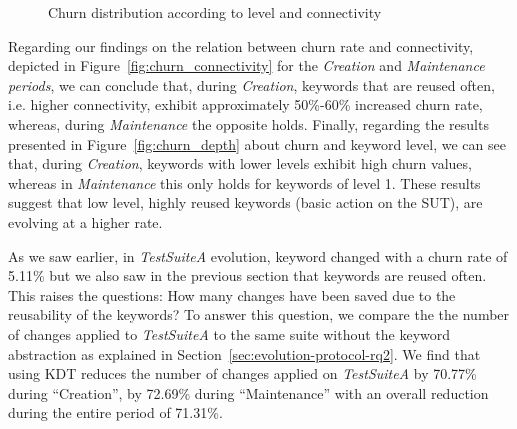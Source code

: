 \begin{figure}
\centering
{}
\caption{Churn distribution according to level and connectivity}  
\label{fig:churn:analysis}
\end{figure}

Regarding our findings on the relation between churn rate and connectivity, depicted in Figure~\ref{fig:churn_connectivity} for the \emph{Creation} and \emph{Maintenance periods}, we can conclude that, during \emph{Creation}, keywords that are reused often, i.e. higher connectivity, exhibit approximately 50\%-60\% increased churn rate, whereas, during \emph{Maintenance} the opposite holds. Finally, regarding the results presented in Figure~\ref{fig:churn_depth} about churn and keyword level, we can see that, during \emph{Creation}, keywords with lower levels exhibit high churn values, whereas in \emph{Maintenance} this only holds for keywords of level 1. These results suggest that low level, highly reused keywords (basic action on the SUT), are evolving at a higher rate.

As we saw earlier, in \emph{TestSuiteA} evolution, keyword changed with a churn rate of 5.11\% but we also saw in the previous section that keywords are reused often. This raises the questions: How many changes have been saved due to the reusability of the keywords? To answer this question, we compare the the number of changes applied to \emph{TestSuiteA} to the same suite without the keyword abstraction as explained in Section~\ref{sec:evolution-protocol-rq2}. We find that using KDT reduces the number of changes applied on \emph{TestSuiteA} by 70.77\% during ``Creation'', by 72.69\% during ``Maintenance'' with an overall reduction during the entire period of 71.31\%. 

